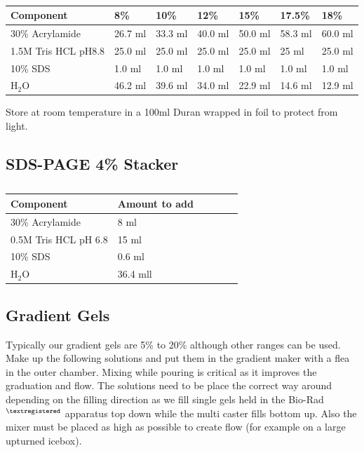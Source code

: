 \documentclass{tufte-book} %
\begin{document}
\begin{table}[ht]
  \centering
  \selectfont
  \begin{tabular}{lllllll}
    \toprule
    Component & 8\% & 10\% & 12\% & 15\% & 17.5\% &18\% \\
    \midrule
   30\% Acrylamide		& 26.7 ml & 33.3 ml & 40.0 ml	& 50.0 ml	& 58.3 ml	 & 60.0 ml \\
   1.5M Tris HCL pH8.8 	& 25.0 ml	& 25.0 ml	& 25.0 ml	& 25.0 ml	& 25 ml	 & 25.0 ml	\\
   10\% SDS			& 1.0 ml	& 1.0 ml	& 1.0 ml	& 1.0 ml	& 1.0 ml	 & 1.0 ml 	\\
    H$_{2}$O 			& 46.2 ml	& 39.6 ml	& 34.0 ml	& 22.9 ml	& 14.6 ml	 & 12.9 ml\\

    \bottomrule
  \end{tabular}
  \caption{}
  \label{tab:res}
\end{table}

Store at room temperature in a 100ml Duran wrapped in foil to protect from light.
\newpage

\subsection{SDS-PAGE 4\% Stacker}

\begin{table}[ht]
  \centering
  \selectfont
  \begin{tabular}{llllll}
    \toprule
    Component & Amount to add \\
    \midrule
   30\% Acrylamide		& 8 ml \\
   0.5M Tris HCL pH 6.8 	& 15 ml	\\
   10\% SDS			& 0.6 ml 	\\
    H$_{2}$O 			& 36.4 mll\\

    \bottomrule
  \end{tabular}
  \caption{}
  \label{tab:stack}
\end{table}

\subsection{Gradient Gels}

Typically our gradient gels are 5\% to 20\% although other ranges can be used. Make up the following solutions and put them in the gradient maker with a flea in the outer chamber. Mixing while pouring is critical as it improves the graduation and flow. The solutions need to be place the correct way around depending on the filling direction as we fill single gels held in the Bio-Rad$^{\textregistered}$  apparatus top down while the multi caster fills bottom up. Also the mixer must be placed as high as possible to create flow (for example on a large upturned icebox).
\end{document}
